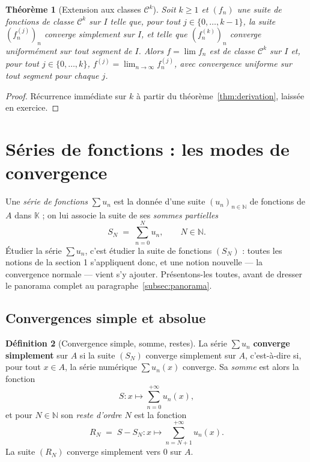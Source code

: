 \documentclass[11pt,a4paper]{article}
\theoremstyle{plain}
\newtheorem{theoreme}{Théorème}[section]
\theoremstyle{definition}
\newtheorem{definition}[theoreme]{Définition}
\theoremstyle{remark}
\newcommand{\N}{\mathbb{N}}
\newcommand{\K}{\mathbb{K}}
\numberwithin{equation}{section}
\begin{document}
\begin{theoreme}[Extension aux classes $\mathcal{C}^k$]\label{thm:Ck}
Soit $k\geq 1$ et $(f_n)$ une suite de fonctions de classe $\mathcal{C}^k$
sur $I$ telle que, pour tout $j\in\{0,\dots,k-1\}$, la suite
$(f_n^{(j)})_n$ converge simplement sur $I$, et telle que
$(f_n^{(k)})_n$ converge uniformément sur tout segment de $I$. Alors
$f=\lim f_n$ est de classe $\mathcal{C}^k$ sur $I$ et, pour tout
$j\in\{0,\dots,k\}$,
$f^{(j)} = \lim_{n\to\infty} f_n^{(j)}$, avec convergence uniforme sur tout
segment pour chaque $j$.
\end{theoreme}

\begin{proof}
Récurrence immédiate sur $k$ à partir du théorème~\ref{thm:derivation},
laissée en exercice.
\end{proof}

\section{Séries de fonctions : les modes de convergence}

Une \emph{série de fonctions} $\sum u_n$ est la donnée d'une suite
$(u_n)_{n\in\N}$ de fonctions de $A$ dans $\K$ ; on lui associe la suite
de ses \emph{sommes partielles}
\[
    S_N \;=\; \sum_{n=0}^{N} u_n , \qquad N\in\N .
\]
Étudier la série $\sum u_n$, c'est étudier la suite de fonctions $(S_N)$ :
toutes les notions de la section 1 s'appliquent donc, et une notion
nouvelle --- la convergence normale --- vient s'y ajouter. Présentons-les
toutes, avant de dresser le panorama complet au
paragraphe~\ref{subsec:panorama}.

\subsection{Convergences simple et absolue}

\begin{definition}[Convergence simple, somme, restes]
La série $\sum u_n$ \textbf{converge simplement} sur $A$ si la suite
$(S_N)$ converge simplement sur $A$, c'est-à-dire si, pour tout $x\in A$,
la série numérique $\sum u_n(x)$ converge. Sa \emph{somme} est alors la
fonction
\[
    S : x \longmapsto \sum_{n=0}^{+\infty} u_n(x),
\]
et pour $N\in\N$ son \emph{reste d'ordre $N$} est la fonction
\[
    R_N \;=\; S - S_N : x \longmapsto \sum_{n=N+1}^{+\infty} u_n(x) .
\]
La suite $(R_N)$ converge simplement vers $0$ sur $A$.
\end{definition}
\end{document}
